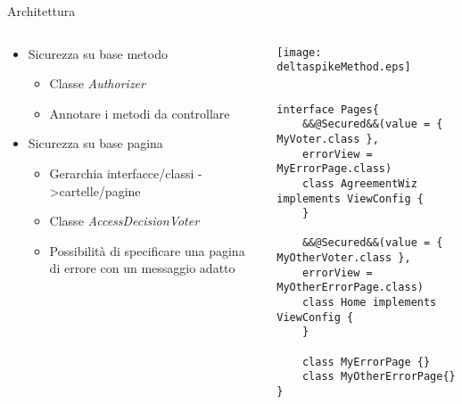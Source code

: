 \begin{frame}[fragile]{Architettura}
\begin{columns}[T]
\begin{column}{.5\textwidth}


\begin{itemize}
\item Sicurezza su base metodo

	\begin{itemize}
	\item Classe \textsl{Authorizer}
	\vspace{0.8em}
	\item Annotare i metodi\newline
	da controllare
	\end{itemize}

\vspace{0.8em}
\item Sicurezza su base pagina
	\begin{itemize}
	\item Gerarchia interfacce/classi -\textgreater  cartelle/pagine
	\vspace{0.8em}
	\item Classe \textsl{AccessDecisionVoter}
	\vspace{0.8em}
	\item Possibilità di specificare\newline
	una pagina di errore\newline
	con un messaggio adatto
	\end{itemize}
\end{itemize}
\end{column}

\begin{column}{.5\textwidth}
\vspace{2.6em}
\texttt{[image: deltaspikeMethod.eps]}

\vspace{1.6em}
\begin{lstlisting}[basicstyle={\tiny\ttfamily}]

interface Pages{
    &&@Secured&&(value = { MyVoter.class }, 
    errorView = MyErrorPage.class)
    class AgreementWiz implements ViewConfig {
    }

    &&@Secured&&(value = { MyOtherVoter.class },
    errorView = MyOtherErrorPage.class)
    class Home implements ViewConfig {
    }
    
    class MyErrorPage {}
    class MyOtherErrorPage{}
}
\end{lstlisting}

\end{column}

\end{columns}
\end{frame}

